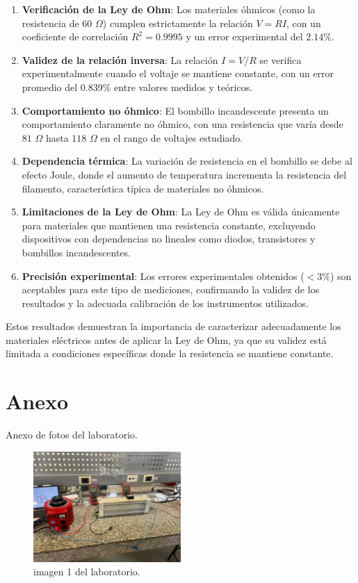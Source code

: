 \documentclass[11pt,twocolumn]{article}
\begin{document}
\begin{enumerate}
    \item \textbf{Verificación de la Ley de Ohm}: Los materiales óhmicos (como la resistencia de 60 $\Omega$) cumplen estrictamente la relación $V = RI$, con un coeficiente de correlación $R^2 = 0.9995$ y un error experimental del $2.14\%$.

    \item \textbf{Validez de la relación inversa}: La relación $I = V/R$ se verifica experimentalmente cuando el voltaje se mantiene constante, con un error promedio del $0.839\%$ entre valores medidos y teóricos.

    \item \textbf{Comportamiento no óhmico}: El bombillo incandescente presenta un comportamiento claramente no óhmico, con una resistencia que varía desde $81$ $\Omega$ hasta $118$ $\Omega$ en el rango de voltajes estudiado.

    \item \textbf{Dependencia térmica}: La variación de resistencia en el bombillo se debe al efecto Joule, donde el aumento de temperatura incrementa la resistencia del filamento, característica típica de materiales no óhmicos.

    \item \textbf{Limitaciones de la Ley de Ohm}: La Ley de Ohm es válida únicamente para materiales que mantienen una resistencia constante, excluyendo dispositivos con dependencias no lineales como diodos, transistores y bombillos incandescentes.

    \item \textbf{Precisión experimental}: Los errores experimentales obtenidos ($< 3\%$) son aceptables para este tipo de mediciones, confirmando la validez de los resultados y la adecuada calibración de los instrumentos utilizados.
\end{enumerate}

Estos resultados demuestran la importancia de caracterizar adecuadamente los materiales eléctricos antes de aplicar la Ley de Ohm, ya que su validez está limitada a condiciones específicas donde la resistencia se mantiene constante.

\section{Anexo}

Anexo de fotos del laboratorio.

\begin{figure}[H]
    \centering
    \includegraphics[width=0.5\textwidth]{Anexos/img1.jpg}
    \caption{imagen 1 del laboratorio.}
    \label{fig:lab1}
\end{figure}
\end{document}
